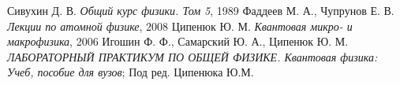 \documentclass[a4paper]{article}
\begin{document}
	\begin{thebibliography}{3}
		 Сивухин Д. В. \emph{Общий курс физики. Том 5}, 1989
		 Фаддеев М. А., Чупрунов Е. В. \emph{Лекции по атомной физике}, 2008
		 Ципенюк Ю. М. \emph{Квантовая микро- и макрофизика}, 2006
		 Игошин Ф. Ф., Самарский Ю. А., Ципенюк Ю. М. \emph{ЛАБОРАТОРНЫЙ ПРАКТИКУМ ПО ОБЩЕЙ ФИЗИКЕ. Квантовая физика: Учеб, пособие для вузов}; Под ред. Ципенюка Ю.М.
	\end{thebibliography}
\end{document}
